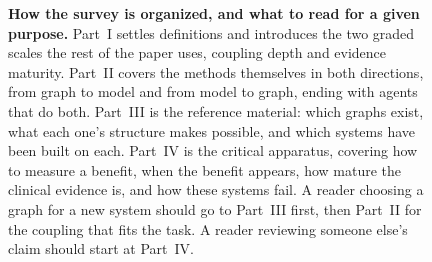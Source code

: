 \begin{figure}[!t]
{%
}
\caption{\textbf{How the survey is organized, and what to read for a given purpose.} Part~I settles definitions and introduces the two graded scales the rest of the paper uses, coupling depth and evidence maturity. Part~II covers the methods themselves in both directions, from graph to model and from model to graph, ending with agents that do both. Part~III is the reference material: which graphs exist, what each one's structure makes possible, and which systems have been built on each. Part~IV is the critical apparatus, covering how to measure a benefit, when the benefit appears, how mature the clinical evidence is, and how these systems fail. A reader choosing a graph for a new system should go to Part~III first, then Part~II for the coupling that fits the task. A reader reviewing someone else's claim should start at Part~IV.}
\label{fig:roadmap}
\end{figure}
